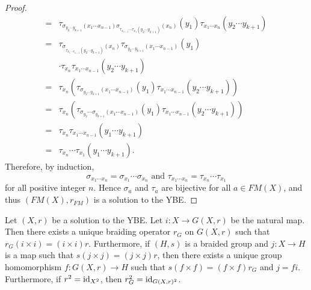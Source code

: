 \begin{proof}
\begin{align*}
    =&\tau_{\sigma_{y_2\cdots y_{k+1}}(x_1\cdots x_{n-1})\sigma_{\tau_{x_{n-1}}\cdots\tau_{x_{1}}(y_{2}\cdots y_{k+1})}(x_n)}(y_{1})\tau_{x_1\cdots x_n}(y_2\cdots y_{k+1})\\
    =&\tau_{\sigma_{\tau_{x_{1}\cdots x_{n-1}}(y_{2}\cdots y_{k+1})}(x_n)}\tau_{\sigma_{y_2\cdots y_{k+1}}(x_1\cdots x_{n-1})}(y_{1})\\
    &\cdot\tau_{x_n}\tau_{x_1\cdots x_{n-1}}(y_2\cdots y_{k+1})\\
    =&\tau_{x_n}\left(\tau_{\sigma_{y_2\cdots y_{k+1}}(x_1\cdots x_{n-1})}(y_{1})\tau_{x_1\cdots x_{n-1}}(y_2\cdots y_{k+1})\right)\\
    =&\tau_{x_n}\left(\tau_{\sigma_{y_2}\cdots\sigma_{y_{k+1}}(x_1\cdots x_{n-1})}(y_{1})\tau_{x_1\cdots x_{n-1}}(y_2\cdots y_{k+1})\right)\\
    =&\tau_{x_n}\tau_{x_1\cdots x_{n-1}}(y_1\cdots y_{k+1})\\
    =&\tau_{x_n}\cdots\tau_{x_1}(y_1\cdots y_{k+1}).
    \end{align*}
Therefore, by induction,
\[\sigma_{x_1\cdots x_n}=\sigma_{x_1}\cdots\sigma_{x_n}\text{ and }\tau_{x_1\cdots x_n}=\tau_{x_n}\cdots \tau_{x_1}\]
for all positive integer $n$. Hence $\sigma_a$ and $\tau_a$ are bijective for all $a\in FM(X)$, and thus $(FM(X),r_{FM})$ is a solution to the YBE.
\end{proof}

\begin{theorem}
\label{thm:LYZ9}
Let $(X,r)$ be a solution to the YBE. Let $i\colon X\rightarrow G(X,r)$ be the natural map. Then there exists a unique braiding operator $r_G$ on $G(X,r)$ such that $r_G (i\times i)=(i\times i) r$. Furthermore, if $(H,s)$ is a braided group and $j\colon X\rightarrow H$ is a map such that
$s (j\times j)=(j\times j) r$, then there exists a unique group homomorphism $f\colon G(X,r)\rightarrow H$ such that $s (f\times f)=(f\times f) r_G$ and $j=f i$. Furthermore, if $r^2=\operatorname{id}_{X^2}$, then $r_G^2=\operatorname{id}_{G(X,r)^2}$.
\end{theorem}

